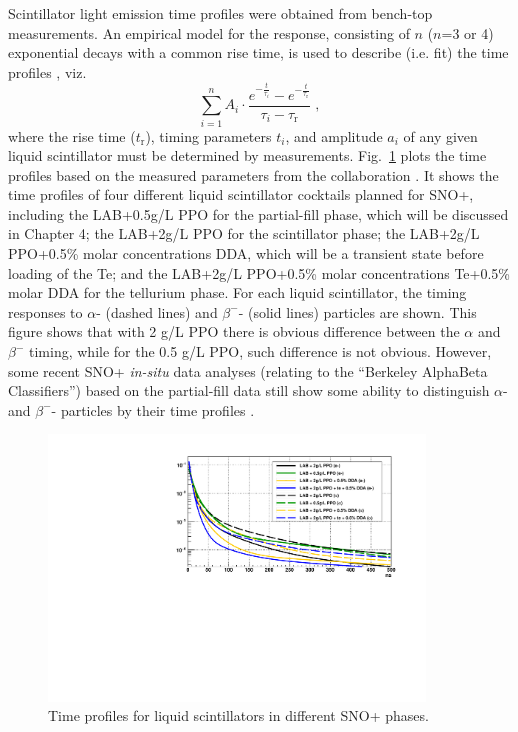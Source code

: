 Scintillator light emission time profiles were obtained from bench-top measurements. An empirical model for the response, consisting of $n$ ($n$=3 or 4) exponential decays with a common rise time, is used to describe (i.e. fit) the time profiles \cite{biller2020slow}, viz.
\begin{equation}
\sum^{n}_{i=1}A_i\cdot\frac{e^{-\frac{t}{\tau_i}}-e^{-\frac{t}{\tau_{\mathrm{r}}}}}{\tau_i-\tau_{\mathrm{r}}}\;,
\end{equation}
where the rise time ($t_{\mathrm{r}}$), timing parameters $t_i$, and amplitude $a_i$ of any given liquid scintillator must be determined by measurements. Fig.~\ref{fig:allTiming} plots the time profiles based on the measured parameters from the collaboration \cite{chicagoTiming,tanner0p5,tannerTeDDA,joshW1}. It shows the time profiles of four different liquid scintillator cocktails planned for SNO+, including the LAB+0.5g/L PPO for the partial-fill phase, which will be discussed in Chapter 4; the LAB+2g/L PPO for the scintillator phase; the LAB+2g/L PPO+0.5\% molar concentrations DDA, which will be a transient state before loading of the Te; and the LAB+2g/L PPO+0.5\% molar concentrations Te+0.5\% molar DDA for the tellurium phase. For each liquid scintillator, the timing responses to $\alpha$- (dashed lines) and $\beta^-$- (solid lines) particles are shown. This figure shows that with 2 g/L PPO there is obvious difference between the $\alpha$ and $\beta^-$ timing, while for the 0.5 g/L PPO, such difference is not obvious. However, some recent SNO+ \emph{in-situ} data analyses (relating to the ``Berkeley AlphaBeta Classifiers'') based on the partial-fill data still show some ability to distinguish $\alpha$- and $\beta^-$- particles by their time profiles \cite{maxSmileyBerkeleyAlphaBeta}. 

\begin{figure}[!htb]
	\centering
	\includegraphics[width=10cm]{plotAllTiming.pdf}
	\caption{Time profiles for liquid scintillators in different SNO+ phases.}
	\label{fig:allTiming}
\end{figure}

